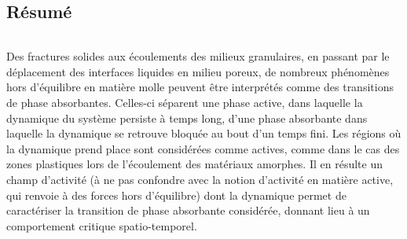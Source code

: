 \chapter*{}
\label{chapter:resume}


\section*{Résumé}

\subparagraph{}Des fractures solides aux écoulements des milieux granulaires, en passant par le déplacement des interfaces liquides en milieu poreux, de nombreux phénomènes hors d’équilibre en matière molle peuvent être interprétés comme des transitions de phase absorbantes. Celles-ci séparent une phase active, dans laquelle la dynamique du système persiste à temps long, d'une phase absorbante dans laquelle la dynamique se retrouve bloquée au bout d’un temps fini. Les régions où la dynamique prend place sont considérées comme actives, comme dans le cas des zones plastiques lors de l'écoulement des matériaux amorphes. Il en résulte un champ d’activité (à ne pas confondre avec la notion d’activité en matière active, qui renvoie à des forces hors d’équilibre) dont la dynamique permet de caractériser la transition de phase absorbante considérée, donnant lieu à un comportement critique spatio-temporel.

